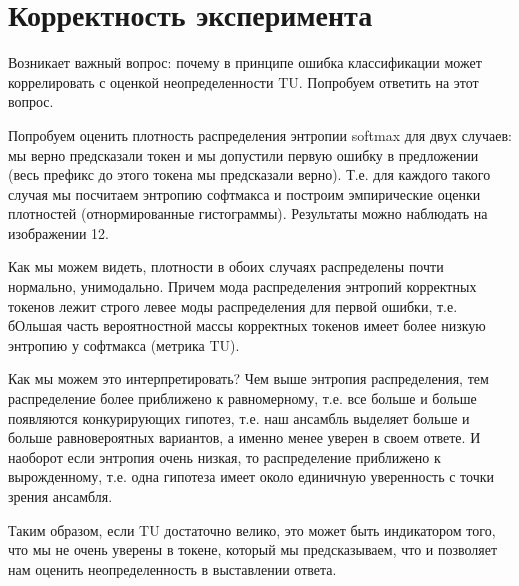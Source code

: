 \documentclass[a4paper,14pt]{extarticle}
\begin{document}
\section{Корректность эксперимента}
	Возникает важный вопрос: почему в принципе ошибка классификации может коррелировать с оценкой неопределенности TU. Попробуем ответить на этот вопрос.
	
	\begin{figure}[t]
	\end{figure}
	
	Попробуем оценить плотность распределения энтропии softmax для двух случаев: мы верно предсказали токен и мы допустили первую ошибку в предложении (весь префикс до этого токена мы предсказали верно). Т.е. для каждого такого случая мы посчитаем энтропию софтмакса и построим эмпирические оценки плотностей (отнормированные гистограммы). Результаты можно наблюдать на изображении 12.
	
	Как мы можем видеть, плотности в обоих случаях распределены почти нормально, унимодально. Причем мода распределения энтропий корректных токенов лежит строго левее моды распределения для первой ошибки, т.е. бОльшая часть вероятностной массы корректных токенов имеет более низкую энтропию у софтмакса (метрика TU). 
	
	Как мы можем это интерпретировать? Чем выше энтропия распределения, тем распределение более приближено к равномерному, т.е. все больше и больше появляются конкурирующих гипотез, т.е. наш ансамбль выделяет больше и больше равновероятных вариантов, а именно менее уверен в своем ответе. И наоборот если энтропия очень низкая, то распределение приближено к вырожденному, т.е. одна гипотеза имеет около единичную уверенность с точки зрения ансамбля. 
	
	Таким образом, если TU достаточно велико, это может быть индикатором того, что мы не очень уверены в токене, который мы предсказываем, что и позволяет нам оценить неопределенность в выставлении ответа.
	
\end{document}

